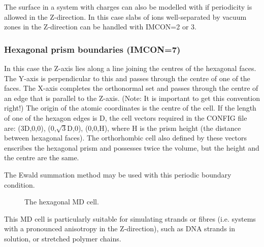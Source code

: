 The surface in a system with charges can also be modelled with \D{} if
periodicity is allowed in the Z-direction. In this case slabs of
ions well-separated by vacuum zones in the Z-direction can be handled
with IMCON=2 or 3.

\subsubsection*{Hexagonal prism boundaries (IMCON=7)}

In this case the Z-axis lies along a line joining the centres of the
hexagonal faces. The Y-axis is perpendicular to this and passes
through the centre of one of the faces. The X-axis completes the
orthonormal set and passes through the centre of an edge that is
parallel to the Z-axis. (Note: It is important to get this convention
right!) The origin of the atomic coordinates is the centre of the
cell. If the length of one of the hexagon edges is D, the cell vectors
required in the CONFIG file are: (3D,0,0), (0,$\sqrt{3}$D,0), (0,0,H),
where H is the prism height (the distance between hexagonal
faces). The orthorhombic cell also defined by these vectors enscribes the
hexagonal prism and possesses twice the volume, but the height
and the centre are the same. 

The Ewald summation method may be used with this periodic boundary condition.

\begin{figure}[ht]
\begin{center}
\centerline{}
\caption{The hexagonal MD cell.}
\end{center}
\end{figure}

This MD cell is particularly suitable for simulating strands or fibres
(i.e. systems with a pronounced anisotropy in the Z-direction), such as
DNA strands in solution, or stretched polymer chains.

